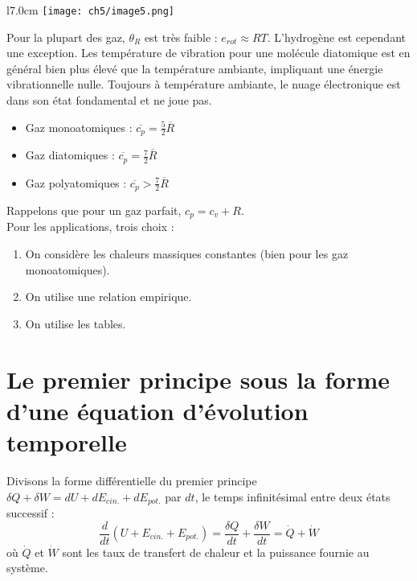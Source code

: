 \begin{wrapfigure}[12]{l}{7.0cm}
	\vspace{-5mm}
	\texttt{[image: ch5/image5.png]}
\end{wrapfigure}
Pour la plupart des gaz, $\theta_R$ est très faible : $e_{rot}\approx RT$. 
L'hydrogène est cependant une exception. Les température de vibration 
pour une molécule diatomique est en général bien plus élevé que la 
température ambiante, impliquant une énergie vibrationnelle nulle. 
Toujours à température ambiante, le nuage électronique est dans son 
état fondamental et ne joue pas.
\begin{itemize}
\item Gaz monoatomiques : $\overline{c_p} = \frac{5}{2}\overline{R}$
\item Gaz diatomiques : $\overline{c_p} = \frac{7}{2}\overline{R}$
\item Gaz polyatomiques : $\overline{c_p} > \frac{7}{2}\overline{R}$
\end{itemize}
Rappelons que pour un gaz parfait, $c_p=c_v+R$.\\

Pour les applications, trois choix :
\begin{enumerate}
\item On considère les chaleurs massiques constantes (bien pour les gaz 
monoatomiques).
\item On utilise une relation empirique.
\item On utilise les tables.
\end{enumerate}

\section{Le premier principe sous la forme d'une équation d'évolution 
temporelle}
Divisons la forme différentielle du premier principe $\delta Q + \delta 
W = dU + dE_{cin.} + dE_{pot.}$ par $dt$, le temps infinitésimal entre 
deux états successif :
\begin{equation}
\frac{d}{dt}\left(U + E_{cin.} + E_{pot.}\right) = \frac{\delta Q}{dt} 
+\frac{\delta W}{dt} = \dot{Q}+\dot{W}
\end{equation}
où $\dot{Q}$ et $\dot{W}$ sont les taux de transfert de chaleur et la 
puissance fournie au système.

